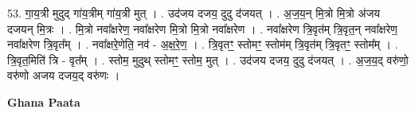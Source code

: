 \documentclass[17pt]{extarticle}
\begin{document}
53. गा॒य॒त्री मुदुद् गा॑य॒त्रीम् गा॑य॒त्री मुत् । . उद॑जय दजय॒ दुदु द॑जयत् । . अ॒ज॒य॒न् मि॒त्रो मि॒त्रो अ॑जय दजयन् मि॒त्रः । . मि॒त्रो नवा᳚क्षरेण॒ नवा᳚क्षरेण मि॒त्रो मि॒त्रो नवा᳚क्षरेण । . नवा᳚क्षरेण त्रि॒वृत॑म् त्रि॒वृत॒न् नवा᳚क्षरेण॒ नवा᳚क्षरेण त्रि॒वृत᳚म् । . नवा᳚क्षरे॒णेति॒ नव॑ - अ॒क्ष॒रे॒ण॒ । . त्रि॒वृतꣳ॒॒ स्तोमꣳ॒॒ स्तोम॑म् त्रि॒वृत॑म् त्रि॒वृतꣳ॒॒ स्तोम᳚म् । . त्रि॒वृत॒मिति॑ त्रि - वृत᳚म् । . स्तोम॒ मुदुथ् स्तोमꣳ॒॒ स्तोम॒ मुत् । . उद॑जय दजय॒ दुदु द॑जयत् । . अ॒ज॒य॒द् वरु॑णो॒ वरु॑णो अजय दजय॒द् वरु॑णः । \newline

\textbf{Ghana Paata } \newline
\end{document}
